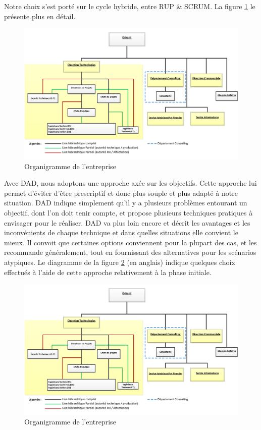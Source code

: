\begin{spacing}{1.5}
Notre choix s'est porté sur le cycle hybride, entre RUP \& SCRUM. La figure \ref{fig:rup_scrum_dad} le présente plus en détail.
\begin{figure}[h]
\centering
\includegraphics[scale=0.8]{organigramme.png}
\caption{Organigramme de l'entreprise}
\label{fig:rup_scrum_dad}
\end{figure}

Avec DAD, nous adoptons une approche axée sur les objectifs. Cette approche lui permet d'éviter d'être prescriptif et donc plus souple et plus adapté à notre situation. DAD indique simplement qu'il y a plusieurs problèmes entourant un objectif, dont l'on doit tenir compte, et propose plusieurs techniques pratiques à envisager pour le réaliser. DAD va plus loin encore et décrit les avantages et les inconvénients de chaque technique et dans quelles situations elle convient le mieux. Il convoit que certaines options conviennent pour la plupart des cas, et les recommande généralement, tout en fournissant des alternatives pour les scénarios atypiques. Le diagramme de la figure \ref{fig:initialGoal} (en anglais) indique quelques choix effectués à l'aide de cette approche relativement à la phase initiale.

\begin{figure}[h]
\centering
\includegraphics[scale=0.8]{organigramme.png}
\caption{Organigramme de l'entreprise}
\label{fig:initialGoal}
\end{figure}


\end{spacing}

